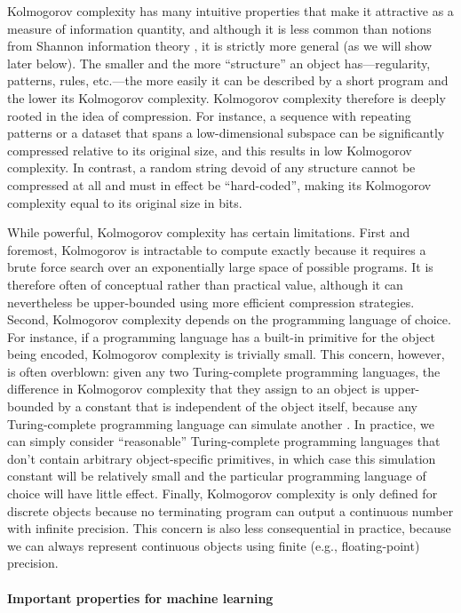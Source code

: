 \documentclass{article}
\begin{document}
\begin{appendices}
Kolmogorov complexity has many intuitive properties that make it attractive as a measure of information quantity, and although it is less common than notions from Shannon information theory \citep{shannon2001mathematical}, it is strictly more general (as we will show later below). The smaller and the more ``structure'' an object has---regularity, patterns, rules, etc.---the more easily it can be described by a short program and the lower its Kolmogorov complexity. Kolmogorov complexity therefore is deeply rooted in the idea of compression. For instance, a sequence with repeating patterns or a dataset that spans a low-dimensional subspace can be significantly compressed relative to its original size, and this results in low Kolmogorov complexity. In contrast, a random string devoid of any structure cannot be compressed at all and must in effect be ``hard-coded'', making its Kolmogorov complexity equal to its original size in bits.

While powerful, Kolmogorov complexity has certain limitations. First and foremost, Kolmogorov is intractable to compute exactly because it requires a brute force search over an exponentially large space of possible programs. It is therefore often of conceptual rather than practical value, although it can nevertheless be upper-bounded using more efficient compression strategies. Second, Kolmogorov complexity depends on the programming language of choice. For instance, if a programming language has a built-in primitive for the object being encoded, Kolmogorov complexity is trivially small. This concern, however, is often overblown: given any two Turing-complete programming languages, the difference in Kolmogorov complexity that they assign to an object is upper-bounded by a constant that is independent of the object itself, because any Turing-complete programming language can simulate another \citep{grunwald2003kolmogorov,fortnow2000kolmogorov}. In practice, we can simply consider ``reasonable'' Turing-complete programming languages that don't contain arbitrary object-specific primitives, in which case this simulation constant will be relatively small and the particular programming language of choice will have little effect. Finally, Kolmogorov complexity is only defined for discrete objects because no terminating program can output a continuous number with infinite precision. This concern is also less consequential in practice, because we can always represent continuous objects using finite (e.g., floating-point) precision.

\paragraph{Important properties for machine learning}


\end{appendices}
\end{document}
